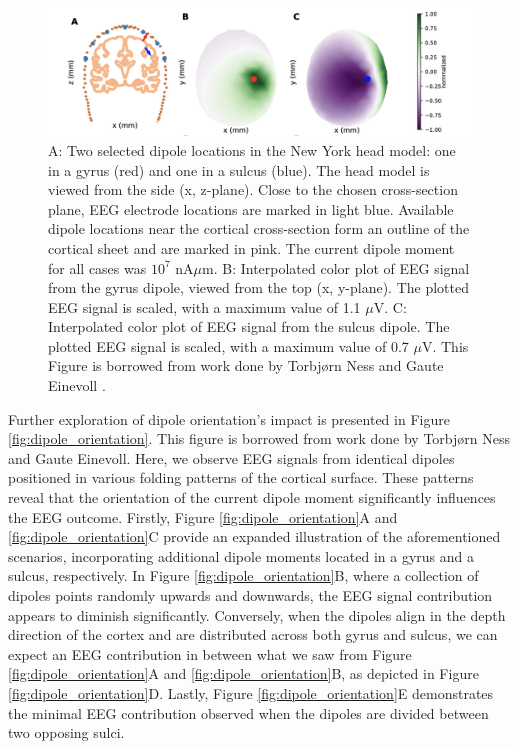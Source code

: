 \documentclass[a4paper, UKenglish, 11pt]{uiomaster}
\begin{document}
\begin{figure}[!htb]
    \centering
    \includegraphics[width=\linewidth]{figures/gyrus_and_sulcus_EEG.png}
    \caption{A: Two selected dipole locations in the New York head model: one in a gyrus (red) and one in a sulcus (blue). The head model is viewed from the side (x, z-plane). Close to the chosen cross-section plane, EEG electrode locations are marked in light blue. Available dipole locations near the cortical cross-section form an outline of the cortical sheet and are marked in pink. The current dipole moment for all cases was $10^7$ nA$\mu$m. B: Interpolated color plot of EEG signal from the gyrus dipole, viewed from the top (x, y-plane). The plotted EEG signal is scaled, with a maximum value of 1.1 $\mu$V. C: Interpolated color plot of EEG signal from the sulcus dipole. The plotted EEG signal is scaled, with a maximum value of 0.7 $\mu$V. This Figure is borrowed from work done by Torbjørn Ness and Gaute Einevoll \cite{naess2021biophysically}.}
    \label{fig:gyrus_and_sulcus_EEG}
\end{figure}

Further exploration of dipole orientation's impact is presented in Figure \ref{fig:dipole_orientation}. This figure is borrowed from work done by Torbjørn Ness and Gaute Einevoll. Here, we observe EEG signals from identical dipoles positioned in various folding patterns of the cortical surface. These patterns reveal that the orientation of the current dipole moment significantly influences the EEG outcome. Firstly, Figure \ref{fig:dipole_orientation}A and \ref{fig:dipole_orientation}C provide an expanded illustration of the aforementioned scenarios, incorporating additional dipole moments located in a gyrus and a sulcus, respectively. In Figure \ref{fig:dipole_orientation}B, where a collection of dipoles points randomly upwards and downwards, the EEG signal contribution appears to diminish significantly. Conversely, when the dipoles align in the depth direction of the cortex and are distributed across both gyrus and sulcus, we can expect an EEG contribution in between what we saw from Figure \ref{fig:dipole_orientation}A and \ref{fig:dipole_orientation}B, as depicted in Figure \ref{fig:dipole_orientation}D. Lastly, Figure \ref{fig:dipole_orientation}E demonstrates the minimal EEG contribution observed when the dipoles are divided between two opposing sulci.
\end{document}
